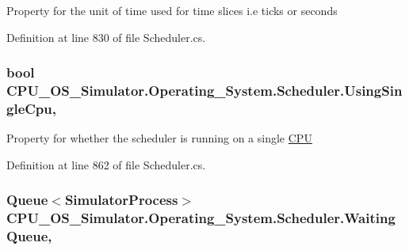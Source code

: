 Property for the unit of time used for time slices i.\+e ticks or seconds 



Definition at line 830 of file Scheduler.\+cs.

\hypertarget{class_c_p_u___o_s___simulator_1_1_operating___system_1_1_scheduler_a3637999160bc25da430731042f42dd81}{}
\subsubsection[{Using\+Single\+Cpu}]{\setlength{\rightskip}{0pt plus 5cm}bool C\+P\+U\+\_\+\+O\+S\+\_\+\+Simulator.\+Operating\+\_\+\+System.\+Scheduler.\+Using\+Single\+Cpu\hspace{0.3cm}{\ttfamily [get]}, {\ttfamily [set]}}\label{class_c_p_u___o_s___simulator_1_1_operating___system_1_1_scheduler_a3637999160bc25da430731042f42dd81}


Property for whether the scheduler is running on a single \hyperlink{namespace_c_p_u___o_s___simulator_1_1_c_p_u}{C\+P\+U} 



Definition at line 862 of file Scheduler.\+cs.

\hypertarget{class_c_p_u___o_s___simulator_1_1_operating___system_1_1_scheduler_aac41827d1eff5710d0a9b5ea664dd99f}{}
\subsubsection[{Waiting\+Queue}]{\setlength{\rightskip}{0pt plus 5cm}Queue$<${\bf Simulator\+Process}$>$ C\+P\+U\+\_\+\+O\+S\+\_\+\+Simulator.\+Operating\+\_\+\+System.\+Scheduler.\+Waiting\+Queue\hspace{0.3cm}{\ttfamily [get]}, {\ttfamily [set]}}\label{class_c_p_u___o_s___simulator_1_1_operating___system_1_1_scheduler_aac41827d1eff5710d0a9b5ea664dd99f}


